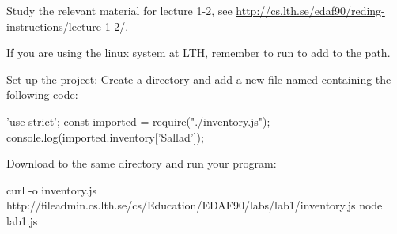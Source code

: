 \documentclass[fleqn, article, a4paper]{memoir}
\begin{document}
\begin{Assignments}

\item Study the relevant material for lecture 1-2, see \url{http://cs.lth.se/edaf90/reding-instructions/lecture-1-2/}. 

\item If you are using the linux system at LTH, remember to run  to add  to the path.

\item %
Set up the project: Create a directory and add a new file named  containing the following code:
\begin{Code}
'use strict';
const imported = require("./inventory.js");
console.log(imported.inventory['Sallad']);
\end{Code}
\noindent Download  to the same directory and run your  program:
\begin{Code}
curl -o inventory.js http://fileadmin.cs.lth.se/cs/Education/EDAF90/labs/lab1/inventory.js
node lab1.js
\end{Code}




\end{Assignments}
\end{document}
